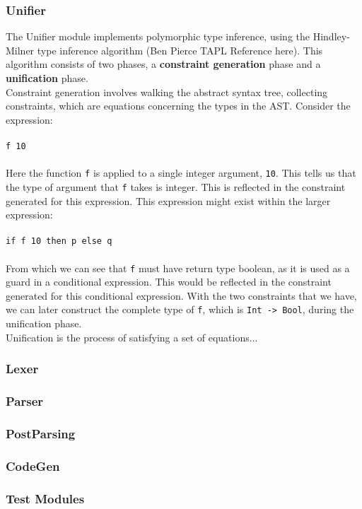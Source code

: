 \documentclass{article}
\begin{document}
\subsubsection{Unifier}
The Unifier module implements polymorphic type inference, using the Hindley-Milner type inference algorithm (Ben Pierce TAPL Reference here). This algorithm consists of two phases, a \textbf{constraint generation} phase and a \textbf{unification} phase.
\\\indent Constraint generation involves walking the abstract syntax tree, collecting constraints, which are equations concerning the types in the AST. Consider the expression:
\\\\
\indent \texttt{f 10}
\\\\
Here the function \texttt{f} is applied to a single integer argument, \texttt{10}. This tells us that the type of argument that \texttt{f} takes is integer. This is reflected in the constraint generated for this expression. This expression might exist within the larger expression:
\\\\
\indent \texttt{if f 10 then p else q}
\\\\
From which we can see that \texttt{f} must have return type boolean, as it is used as a guard in a conditional expression. This would be reflected in the constraint generated for this conditional expression. With the two constraints that we have, we can later construct the complete type of \texttt{f}, which is \texttt{Int -> Bool}, during the unification phase.
\\\indent Unification is the process of satisfying a set of equations...
\subsubsection{Lexer}
\subsubsection{Parser}
\subsubsection{PostParsing}
\subsubsection{CodeGen}
\subsubsection{Test Modules}
\end{document}
